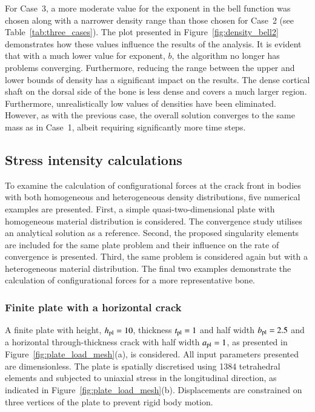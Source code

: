 \documentclass[review]{elsarticle}
\numberwithin{equation}{section}
\begin{document}
For Case~3, a more moderate value for the exponent in the bell function was chosen along with a narrower density range than those chosen for Case~2 (see Table~\ref{tab:three_cases}).
The plot presented in Figure~\ref{fig:density_bell2} demonstrates how these values influence the results of the analysis. 
It is evident that with a much lower value for exponent, $b$, the algorithm no longer has problems converging. 
Furthermore,  reducing the range between the upper and lower bounds of density has a significant impact on the results. 
The dense cortical shaft on the dorsal side of the bone is less dense and covers a much larger region. 
Furthermore, unrealistically low values of densities have been eliminated. 
However, as with the previous case, the overall solution converges to the same mass as in Case~1, albeit requiring significantly more time steps. \\

\subsection{Stress intensity calculations}
\label{sec:release_energy_rate}
To examine the calculation of configurational forces at the crack front in bodies with both homogeneous and heterogeneous density distributions, five numerical examples are presented.
First, a simple quasi-two-dimensional plate with homogeneous material distribution is considered.  The convergence study utilises an analytical solution as a reference.
Second, the proposed singularity elements are included for the same plate problem and their influence on the rate of convergence is presented. 
Third, the same problem is considered again but with a heterogeneous material distribution.
The final two examples demonstrate the calculation of configurational forces for a more representative bone.
 
\subsubsection{Finite plate with a horizontal crack}\label{sec:plate_section}
A finite plate with height, $h_{\rm {pl}} = 10$, thickness $t_{\rm {pl}}=1$ and half width $b_{\rm{pl}} = 2.5$ and a horizontal through-thickness crack with half width $a_{\rm {pl}} = 1$, as presented in Figure~\ref{fig:plate_load_mesh}(a), is considered. All input parameters presented are dimensionless. 
The  plate is spatially discretised using 1384 tetrahedral elements and subjected to uniaxial stress in the longitudinal direction, as indicated in Figure~\ref{fig:plate_load_mesh}(b). 
Displacements are constrained on three vertices of the plate to prevent rigid body motion. 
\end{document}
